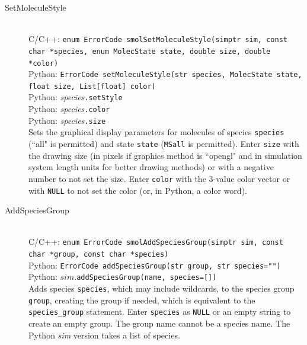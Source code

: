 \documentclass {scrbook}
\newcommand {\ttt} {\texttt}
\begin{document}
\begin{description}
\item[SetMoleculeStyle]
\hfill \\
C/C++: \ttt{enum ErrorCode smolSetMoleculeStyle(simptr sim, const char *species, enum MolecState state, double size, double *color)}\\
Python: \ttt{ErrorCode setMoleculeStyle(str species, MolecState state, float size, List[float] color)}\\
Python: \textit{species}\ttt{.setStyle}\\
Python: \textit{species}\ttt{.color}\\
Python: \textit{species}\ttt{.size}\\
Sets the graphical display parameters for molecules of species \ttt{species} (``all" is permitted) and state \ttt{state} (\ttt{MSall} is permitted). Enter \ttt{size} with the drawing size (in pixels if graphics method is ``opengl" and in simulation system length units for better drawing methods) or with a negative number to not set the size. Enter \ttt{color} with the 3-value color vector or with \ttt{NULL} to not set the color (or, in Python, a color word).

\item[AddSpeciesGroup]
\hfill \\
C/C++: \ttt{enum ErrorCode smolAddSpeciesGroup(simptr sim, const char *group, const char *species)}\\
Python: \ttt{ErrorCode addSpeciesGroup(str group, str species="")}\\
Python: $sim$.\ttt{addSpeciesGroup(name, species=[])}\\
Adds species \ttt{species}, which may include wildcards, to the species group \ttt{group}, creating the group if needed, which is equivalent to the \ttt{species\_group} statement. Enter \ttt{species} as \ttt{NULL} or an empty string to create an empty group. The group name cannot be a species name. The Python \textit{sim} version takes a list of species.


\end{description}
\end{document}
